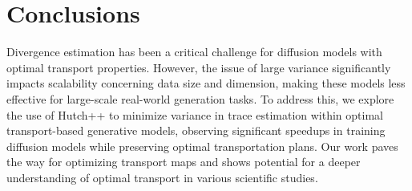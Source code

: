 \section{Conclusions}

Divergence estimation has been a critical challenge for diffusion models with optimal transport properties. However, the issue of large variance significantly impacts scalability concerning data size and dimension, making these models less effective for large-scale real-world generation tasks. To address this, we explore the use of Hutch++ to minimize variance in trace estimation within optimal transport-based generative models, observing significant speedups in training diffusion models while preserving optimal transportation plans. Our work paves the way for optimizing transport maps and shows potential for a deeper understanding of optimal transport in various scientific studies.